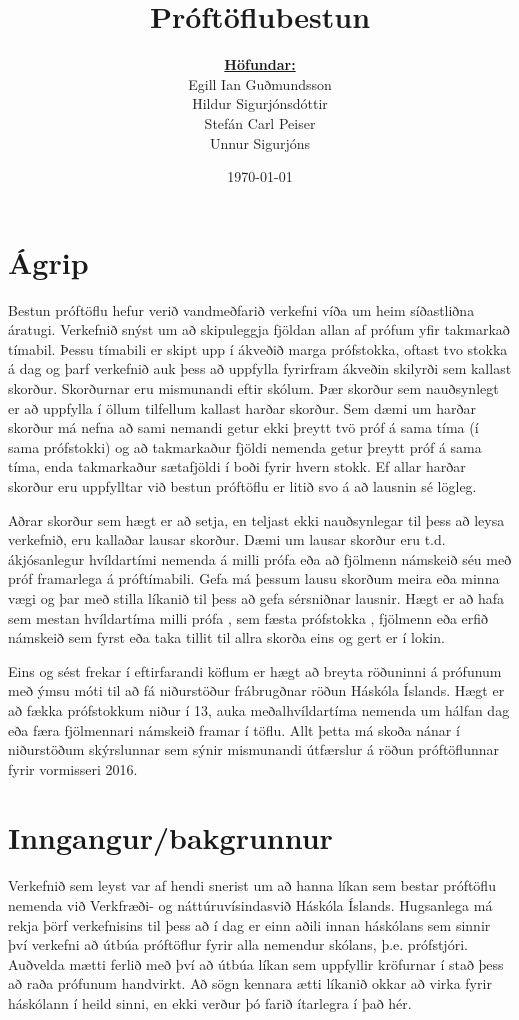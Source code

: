 \documentclass[12pt]{article}
\title{Próftöflubestun}
\author{\underline{\textbf{Höfundar:}}\\	
    Egill Ian Guðmundsson\\
    Hildur Sigurjónsdóttir\\
    Stefán Carl Peiser\\
    Unnur Sigurjóns}
\date{\today}
\begin{document}
\pagestyle{fancy}

\begin{titlepage}
            \maketitle
\end{titlepage}

\newpage
\tableofcontents
\newpage
\section{Ágrip}
Bestun próftöflu hefur verið vandmeðfarið verkefni víða um heim síðastliðna áratugi. Verkefnið snýst um að skipuleggja fjöldan allan af prófum yfir takmarkað tímabil. Þessu tímabili er skipt upp í ákveðið marga prófstokka, oftast tvo stokka á dag og þarf verkefnið auk þess að uppfylla fyrirfram ákveðin skilyrði sem kallast skorður.
Skorðurnar eru mismunandi eftir skólum. Þær skorður sem nauðsynlegt er að uppfylla í öllum tilfellum kallast harðar skorður. Sem dæmi um harðar skorður má nefna að sami nemandi getur ekki þreytt tvö próf á sama tíma (í sama prófstokki) og að takmarkaður fjöldi nemenda getur þreytt próf á sama tíma, enda takmarkaður sætafjöldi í boði fyrir hvern stokk. Ef allar harðar skorður eru uppfylltar við bestun próftöflu er litið svo á að lausnin sé lögleg.

\medskip
Aðrar skorður sem hægt er að setja, en teljast ekki nauðsynlegar til þess að leysa verkefnið, eru kallaðar lausar skorður. Dæmi um lausar skorður eru t.d. ákjósanlegur hvíldartími nemenda á milli prófa eða að fjölmenn námskeið séu með próf framarlega á próftímabili. Gefa má þessum lausu skorðum meira eða minna vægi og þar með stilla líkanið til þess að gefa sérsniðnar lausnir. Hægt er að hafa sem mestan hvíldartíma milli prófa , sem fæsta prófstokka , fjölmenn eða erfið námskeið sem fyrst eða taka tillit til allra skorða eins og gert er í lokin.

\medskip
Eins og sést frekar í eftirfarandi köflum er hægt að breyta röðuninni á prófunum með ýmsu móti til að fá niðurstöður frábrugðnar röðun Háskóla Íslands. Hægt er að fækka prófstokkum niður í 13, auka meðalhvíldartíma nemenda um hálfan dag eða færa fjölmennari námskeið framar í töflu. Allt þetta má skoða nánar í niðurstöðum skýrslunnar sem sýnir mismunandi útfærslur á röðun próftöflunnar fyrir vormisseri 2016.
\newpage
\section{Inngangur/bakgrunnur}
Verkefnið sem leyst var af hendi snerist um að hanna líkan sem bestar próftöflu nemenda við Verkfræði- og náttúruvísindasvið Háskóla Íslands. Hugsanlega má rekja þörf verkefnisins til þess að í dag er einn aðili innan háskólans sem sinnir því verkefni að útbúa próftöflur fyrir alla nemendur skólans, þ.e. prófstjóri. Auðvelda mætti ferlið með því að útbúa líkan sem uppfyllir kröfurnar í stað þess að raða prófunum handvirkt. Að sögn kennara ætti líkanið okkar að virka fyrir háskólann í heild sinni, en ekki verður þó farið ítarlegra í það hér.
\medskip
 
\end{document}
